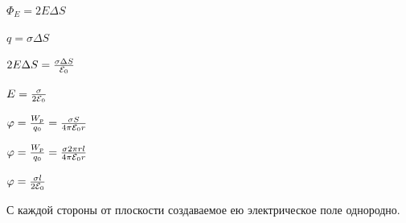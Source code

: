 \documentclass[12pt]{report}
\begin{document}
\begin{center}
    $\Phi_E = 2 E \Delta S$
\end{center}
\begin{center}
    $q = \sigma \Delta S$
\end{center}
\begin{center}
    $2 E \Delta S = \frac{\sigma \Delta S}{\varE_0} $
\end{center}
\begin{center}
    $E = \frac{\sigma}{2 \varE_0} $
\end{center}
\begin{center}
    $\varphi = \frac{W_p}{q_0} = \frac{\sigma S}{4 \pi \varE_0 r}$
\end{center}
\begin{center}
    $\varphi = \frac{W_p}{q_0} = \frac{\sigma 2 \pi r l}{4 \pi \varE_0 r}$
\end{center}
\begin{center}
    $\varphi = \frac{\sigma l}{2 \varE_0}$
\end{center}
\par С каждой стороны от плоскости создаваемое ею электрическое поле однородно.
\end{document}
